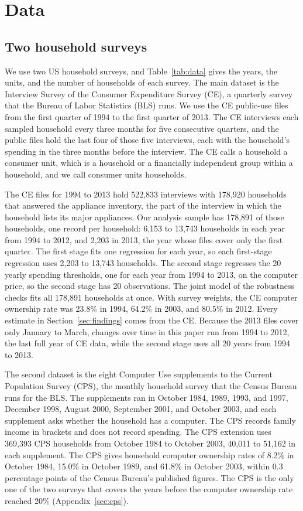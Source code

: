 \documentclass[11pt]{article}
\begin{document}
\section{Data}
\label{sec:data}

\subsection{Two household surveys}

We use two US household surveys, and Table~\ref{tab:data} gives the years, the units, and the number of households of each survey. The main dataset is the Interview Survey of the Consumer Expenditure Survey (CE), a quarterly survey that the Bureau of Labor Statistics (BLS) runs. We use the CE public-use files from the first quarter of 1994 to the first quarter of 2013. The CE interviews each sampled household every three months for five consecutive quarters, and the public files hold the last four of those five interviews, each with the household's spending in the three months before the interview. The CE calls a household a consumer unit, which is a household or a financially independent group within a household, and we call consumer units households.

The CE files for 1994 to 2013 hold 522{,}833 interviews with 178{,}920 households that answered the appliance inventory, the part of the interview in which the household lists its major appliances. Our analysis sample has 178{,}891 of those households, one record per household: 6{,}153 to 13{,}743 households in each year from 1994 to 2012, and 2{,}203 in 2013, the year whose files cover only the first quarter. The first stage fits one regression for each year, so each first-stage regression uses 2{,}203 to 13{,}743 households. The second stage regresses the 20 yearly spending thresholds, one for each year from 1994 to 2013, on the computer price, so the second stage has 20 observations. The joint model of the robustness checks fits all 178{,}891 households at once. With survey weights, the CE computer ownership rate was 23.8\% in 1994, 64.2\% in 2003, and 80.5\% in 2012. Every estimate in Section~\ref{sec:findings} comes from the CE. Because the 2013 files cover only January to March, changes over time in this paper run from 1994 to 2012, the last full year of CE data, while the second stage uses all 20 years from 1994 to 2013.

The second dataset is the eight Computer Use supplements to the Current Population Survey (CPS), the monthly household survey that the Census Bureau runs for the BLS. The supplements ran in October 1984, 1989, 1993, and 1997, December 1998, August 2000, September 2001, and October 2003, and each supplement asks whether the household has a computer. The CPS records family income in brackets and does not record spending. The CPS extension uses 369{,}393 CPS households from October 1984 to October 2003, 40{,}011 to 51{,}162 in each supplement. The CPS gives household computer ownership rates of 8.2\% in October 1984, 15.0\% in October 1989, and 61.8\% in October 2003, within 0.3 percentage points of the Census Bureau's published figures. The CPS is the only one of the two surveys that covers the years before the computer ownership rate reached 20\% (Appendix~\ref{sec:cps}).
\end{document}
